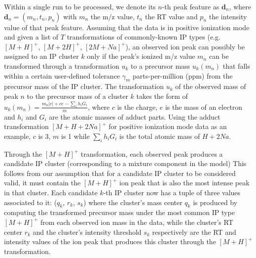 Within a single run to be processed, we denote its $n$-th peak feature as $\textbf{d}_n$, where $\boldsymbol{d}_n=(m_n,t_n,p_n)$ with $m_n$ the m/z value, $t_n$ the RT value and $p_n$ the intensity value of that peak feature. Assuming that the data is in positive ionization mode and given a list of $T$ transformations of commonly-known IP types (e.g. $[M+H]^+$, $[M+2H]^+$, $[2M+Na]^+$), an observed ion peak can possibly be assigned to an IP cluster $k$ only if the peak's ionized m/z value $m_n $ can be transformed through a transformation $u_k$ to a precursor mass $u_k(m_n)$ that falls within a certain user-defined tolerance $\gamma_m$ parts-per-million (ppm) from the precursor mass of the IP cluster. The transformation $u_k$ of the observed mass of peak $n$ to the precursor mass of a cluster $k$ takes the form of $u_k(m_n) = \frac{m_n|c|+ce-\sum_{i} h_i G_i}{m}$, where $c$ is the charge, $e$ is the mass of an electron and $h_i$ and $G_i$ are the atomic masses of adduct parts. Using the adduct transformation $[M+H+2Na]^+$ for positive ionization mode data as an example, $c$ is 3, $m$ is 1 while $\sum_{i} h_i G_i$ is the total atomic mass of $H+2Na$. 

Through the $[M+H]^+$ transformation, each observed peak produces a candidate IP cluster (corresponding to a mixture component in the model)  This follows from our assumption that for a candidate IP cluster to be considered valid, it must contain the $[M+H]^+$ ion peak that is also the most intense peak in that cluster. Each candidate $k$-th IP cluster now has a tuple of three values associated to it: ($q_k$, $r_k$, $s_k$) where the cluster's mass center $q_k$ is produced by computing the transformed precursor mass under the most common IP type $[M+H]^+$ from each observed ion mass in the data, while the cluster's RT center $r_k$ and the cluster's intensity threshold $s_k$ respectively are the RT and intensity values of the ion peak that produces this cluster through the $[M+H]^+$ transformation. 


